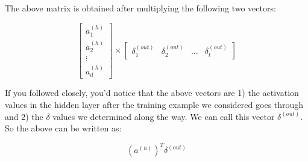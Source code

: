 \documentclass[../main.tex]{subfiles}
\begin{document}
\vspace{5mm} %

The above matrix is obtained after multiplying the following two vectors:

\[
    \begin{bmatrix}
        a_1^{(h)} \\
        a_2^{(h)} \\
        \vdots \\
        a_d^{(h)}
    \end{bmatrix}
    \times
    \begin{bmatrix}
        \delta_1^{(out)} & \delta_2^{(out)} & \dots & \delta_t^{(out)}
    \end{bmatrix}
\]

\vspace{5mm} %

If you followed closely, you'd notice that the above vectors are 1) the activation
values in the hidden layer after the training example we considered goes through and
2) the $\delta$ values we determined along the way. We can call this vector 
$\delta^{(out)}$. So the above can be written as:

\[
    (a^{(h)})^{T} \delta^{(out)}
\]
\end{document}
